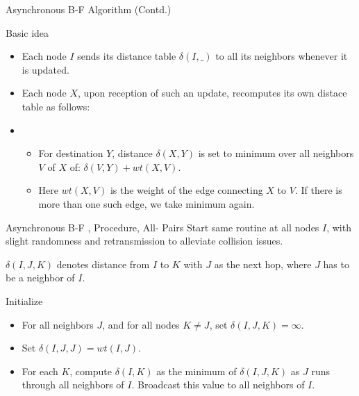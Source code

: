 \begin{frame}{Asynchronous B-F Algorithm (Contd.)}
\begin{block}{Basic idea}
\begin{itemize}
\item Each node $I$ sends its distance table $\delta(I,\_)$ to all its neighbors whenever it is updated.
\item Each node $X$, upon reception of such an update, recomputes its own distace table as follows: 
\item[] \begin{itemize}\item[] For destination $Y$, distance $\delta(X, Y)$ is set to minimum over all neighbors 
$V$ of $X$ of: $\delta(V,Y) + wt(X,V)$. \item[] Here $wt(X,V)$ is the weight of the edge connecting $X$ to $V$. If there is more than one such edge, we
take minimum again. \end{itemize}
\end{itemize}
\end{block}
\end{frame}

\begin{frame}{Asynchronous B-F , Procedure, All- Pairs}
Start same routine at all nodes $I$, with slight randomness and retransmission to alleviate collision issues.

$\delta(I,J,K)$ denotes distance from $I$ to $K$ with $J$ as the next hop, where $J$ has to be a neighbor of $I$.
\begin{block}{Initialize}
\begin{itemize}
\item For all neighbors $J$, and for all nodes $K \neq J$, set $\delta(I,J,K) =\infty$.
\item Set $\delta(I,J,J) = wt(I,J)$.
\item For each $K$, compute $\delta(I,K)$ as the minimum of $\delta(I,J,K)$ as $J$ runs through all neighbors of $I$. Broadcast this value to all neighbors of $I$.
\end{itemize}
\end{block} 
\end{frame}

